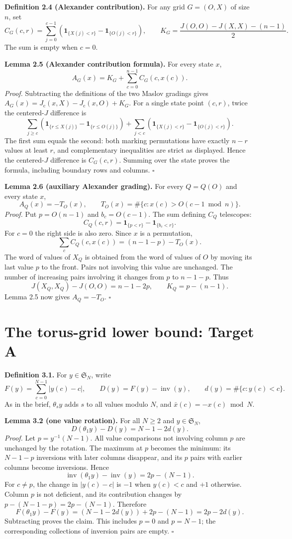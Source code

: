 \documentclass[11pt,a4paper]{article}
\begin{document}
\textbf{Definition 2.4 (Alexander contribution).}
For any grid $G=(O,X)$ of size $n$, set
\[
C_G(c,r)=\sum_{j=0}^{c-1}
\left(\mathbf1_{\{X(j)<r\}}-\mathbf1_{\{O(j)<r\}}\right),
\qquad
K_G=\frac{J(O,O)-J(X,X)-(n-1)}{2}.
\]
The sum is empty when $c=0$.

\textbf{Lemma 2.5 (Alexander contribution formula).}
For every state $x$,
\[
A_G(x)=K_G+\sum_{c=0}^{n-1}C_G(c,x(c)).
\]
\textit{Proof.}
Subtracting the definitions of the two Maslov gradings gives
$A_G(x)=J_{\mathrm c}(x,X)-J_{\mathrm c}(x,O)+K_G$.
For a single state point $(c,r)$, twice the centered-$J$ difference is
\[
\sum_{j\ge c}\left(\mathbf1_{\{r\le X(j)\}}-\mathbf1_{\{r\le O(j)\}}\right)
+\sum_{j<c}\left(\mathbf1_{\{X(j)<r\}}-\mathbf1_{\{O(j)<r\}}\right).
\]
The first sum equals the second: both marking permutations have exactly
$n-r$ values at least $r$, and complementary inequalities are strict as
displayed. Hence the centered-$J$ difference is $C_G(c,r)$. Summing over
the state proves the formula, including boundary rows and columns.
$\square$

\textbf{Lemma 2.6 (auxiliary Alexander grading).}
For every $Q=Q(O)$ and every state $x$,
\[
A_Q(x)=-T_O(x),\qquad
T_O(x)=\#\{c:x(c)>O(c-1\bmod n)\}.
\]
\textit{Proof.}
Put $p=O(n-1)$ and $b_c=O(c-1)$. The sum defining $C_Q$ telescopes:
\[
C_Q(c,r)=\mathbf1_{\{p<r\}}-\mathbf1_{\{b_c<r\}}.
\]
For $c=0$ the right side is also zero. Since $x$ is a permutation,
\[
\sum_cC_Q(c,x(c))=(n-1-p)-T_O(x).
\]
The word of values of $X_Q$ is obtained from the word of values of $O$
by moving its last value $p$ to the front. Pairs not involving this value
are unchanged. The number of increasing pairs involving it changes from
$p$ to $n-1-p$. Thus
\[
J(X_Q,X_Q)-J(O,O)=n-1-2p,
\qquad K_Q=p-(n-1).
\]
Lemma 2.5 now gives $A_Q=-T_O$. $\square$

\section{The torus-grid lower bound: Target A}

\textbf{Definition 3.1.}
For $y\in\mathfrak S_N$, write
\[
F(y)=\sum_{c=0}^{N-1}|y(c)-c|,\qquad
D(y)=F(y)-\operatorname{inv}(y),\qquad
d(y)=\#\{c:y(c)<c\}.
\]
As in the brief, $\theta_s y$ adds $s$ to all values modulo $N$, and
$\bar x(c)=-x(c)\bmod N$.

\textbf{Lemma 3.2 (one value rotation).}
For all $N\ge2$ and $y\in\mathfrak S_N$,
\[
D(\theta_1y)-D(y)=N-1-2d(y).
\]
\textit{Proof.}
Let $p=y^{-1}(N-1)$. All value comparisons not involving column $p$
are unchanged by the rotation. The maximum at $p$ becomes the minimum:
its $N-1-p$ inversions with later columns disappear, and its $p$ pairs
with earlier columns become inversions. Hence
\[
\operatorname{inv}(\theta_1y)-\operatorname{inv}(y)=2p-(N-1).
\]
For $c\ne p$, the change in $|y(c)-c|$ is $-1$ when $y(c)<c$ and $+1$
otherwise. Column $p$ is not deficient, and its contribution changes by
$p-(N-1-p)=2p-(N-1)$. Therefore
\[
F(\theta_1y)-F(y)=(N-1-2d(y))+2p-(N-1)=2p-2d(y).
\]
Subtracting proves the claim. This includes $p=0$ and $p=N-1$; the
corresponding collections of inversion pairs are empty. $\square$
\end{document}
